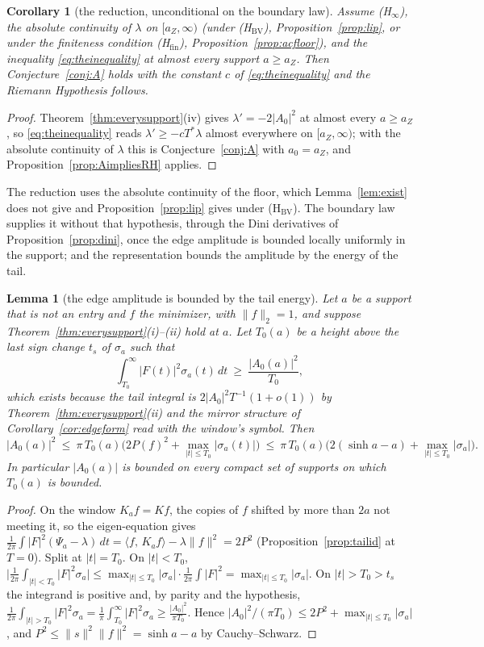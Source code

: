 \documentclass[11pt]{article}
\newtheorem{lemma}[theorem]{Lemma}
\newtheorem{corollary}[theorem]{Corollary}
\theoremstyle{definition}
\theoremstyle{remark}
\newcommand{\ip}[2]{\langle #1,\, #2\rangle}
\newcommand{\Tst}{T^{*}}
\begin{document}
\begin{corollary}[the reduction, unconditional on the boundary law]\label{cor:unconditional}
Assume (H$_\infty$), the absolute continuity of $\lambda$ on $[a_Z,\infty)$ (under (H$_{\mathrm{BV}}$), Proposition~\ref{prop:lip}, or under the finiteness condition (H$_{\mathrm{fin}}$), Proposition~\ref{prop:acfloor}), and the inequality \eqref{eq:theinequality} at almost every support $a\ge a_Z$. Then Conjecture~\ref{conj:A} holds with the constant $c$ of \eqref{eq:theinequality} and the Riemann Hypothesis follows.
\end{corollary}
\begin{proof}
Theorem~\ref{thm:everysupport}(iv) gives $\lambda'=-2|A_0|^2$ at almost every $a\ge a_Z$, so \eqref{eq:theinequality} reads $\lambda'\ge-c\Tst\lambda$ almost everywhere on $[a_Z,\infty)$; with the absolute continuity of $\lambda$ this is Conjecture~\ref{conj:A} with $a_0=a_Z$, and Proposition~\ref{prop:AimpliesRH} applies.
\end{proof}

The reduction uses the absolute continuity of the floor, which Lemma~\ref{lem:exist} does not give and Proposition~\ref{prop:lip} gives under (H$_{\mathrm{BV}}$). The boundary law supplies it without that hypothesis, through the Dini derivatives of Proposition~\ref{prop:dini}, once the edge amplitude is bounded locally uniformly in the support; and the representation bounds the amplitude by the energy of the tail.

\begin{lemma}[the edge amplitude is bounded by the tail energy]\label{lem:A0bound}
Let $a$ be a support that is not an entry and $f$ the minimizer, with $\|f\|_2=1$, and suppose Theorem~\ref{thm:everysupport}(i)--(ii) hold at $a$. Let $T_0(a)$ be a height above the last sign change $t_s$ of $\sigma_a$ such that
\[
\int_{T_0}^\infty|F(t)|^2\sigma_a(t)\,dt\ \ge\ \frac{|A_0(a)|^2}{T_0},
\]
which exists because the tail integral is $2|A_0|^2T^{-1}(1+o(1))$ by Theorem~\ref{thm:everysupport}(ii) and the mirror structure of Corollary~\ref{cor:edgeform} read with the window's symbol. Then
\[
|A_0(a)|^2\ \le\ \pi\,T_0(a)\Big(2P(f)^2+\max_{|t|\le T_0}|\sigma_a(t)|\Big)\ \le\ \pi\,T_0(a)\Big(2(\sinh a-a)+\max_{|t|\le T_0}|\sigma_a|\Big).
\]
In particular $|A_0(a)|$ is bounded on every compact set of supports on which $T_0(a)$ is bounded.
\end{lemma}
\begin{proof}
On the window $K_af=Kf$, the copies of $f$ shifted by more than $2a$ not meeting it, so the eigen-equation gives $\frac1{2\pi}\int|F|^2(\Psi_a-\lambda)\,dt=\ip f{K_af}-\lambda\|f\|^2=2P^2$ (Proposition~\ref{prop:tailid} at $T=0$). Split at $|t|=T_0$. On $|t|<T_0$, $\big|\frac1{2\pi}\int_{|t|<T_0}|F|^2\sigma_a\big|\le\max_{|t|\le T_0}|\sigma_a|\cdot\frac1{2\pi}\int|F|^2=\max_{|t|\le T_0}|\sigma_a|$. On $|t|>T_0>t_s$ the integrand is positive and, by parity and the hypothesis, $\frac1{2\pi}\int_{|t|>T_0}|F|^2\sigma_a=\frac1\pi\int_{T_0}^\infty|F|^2\sigma_a\ge\frac{|A_0|^2}{\pi T_0}$. Hence $|A_0|^2/(\pi T_0)\le2P^2+\max_{|t|\le T_0}|\sigma_a|$, and $P^2\le\|s\|^2\|f\|^2=\sinh a-a$ by Cauchy--Schwarz.
\end{proof}
\end{document}
